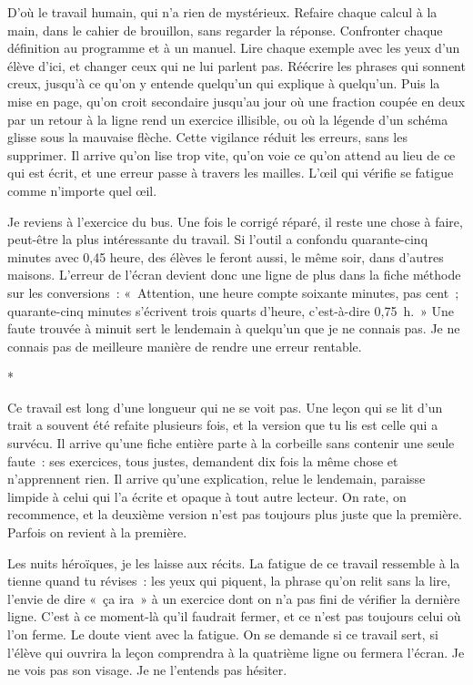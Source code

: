 \documentclass[10.5pt,twoside,openright]{book}
\newcommand{\asterisme}{\par\vspace{0.7em}\centerline{\color{gris}*\quad*\quad*}\vspace{0.7em}\par\noindent}
\begin{document}
D’où le travail humain, qui n’a rien de mystérieux. Refaire chaque calcul à la main, dans le cahier de brouillon, sans regarder la réponse. Confronter chaque définition au programme et à un manuel. Lire chaque exemple avec les yeux d’un élève d’ici, et changer ceux qui ne lui parlent pas. Réécrire les phrases qui sonnent creux, jusqu’à ce qu’on y entende quelqu’un qui explique à quelqu’un. Puis la mise en page, qu’on croit secondaire jusqu’au jour où une fraction coupée en deux par un retour à la ligne rend un exercice illisible, ou où la légende d’un schéma glisse sous la mauvaise flèche. Cette vigilance réduit les erreurs, sans les supprimer. Il arrive qu’on lise trop vite, qu’on voie ce qu’on attend au lieu de ce qui est écrit, et une erreur passe à travers les mailles. L’œil qui vérifie se fatigue comme n’importe quel œil.

Je reviens à l’exercice du bus. Une fois le corrigé réparé, il reste une chose à faire, peut-être la plus intéressante du travail. Si l’outil a confondu quarante-cinq minutes avec 0,45 heure, des élèves le feront aussi, le même soir, dans d’autres maisons. L’erreur de l’écran devient donc une ligne de plus dans la fiche méthode sur les conversions : « Attention, une heure compte soixante minutes, pas cent ; quarante-cinq minutes s’écrivent trois quarts d’heure, c’est-à-dire 0,75 h. » Une faute trouvée à minuit sert le lendemain à quelqu’un que je ne connais pas. Je ne connais pas de meilleure manière de rendre une erreur rentable.

\asterisme

Ce travail est long d’une longueur qui ne se voit pas. Une leçon qui se lit d’un trait a souvent été refaite plusieurs fois, et la version que tu lis est celle qui a survécu. Il arrive qu’une fiche entière parte à la corbeille sans contenir une seule faute : ses exercices, tous justes, demandent dix fois la même chose et n’apprennent rien. Il arrive qu’une explication, relue le lendemain, paraisse limpide à celui qui l’a écrite et opaque à tout autre lecteur. On rate, on recommence, et la deuxième version n’est pas toujours plus juste que la première. Parfois on revient à la première.

Les nuits héroïques, je les laisse aux récits. La fatigue de ce travail ressemble à la tienne quand tu révises : les yeux qui piquent, la phrase qu’on relit sans la lire, l’envie de dire « ça ira » à un exercice dont on n’a pas fini de vérifier la dernière ligne. C’est à ce moment-là qu’il faudrait fermer, et ce n’est pas toujours celui où l’on ferme. Le doute vient avec la fatigue. On se demande si ce travail sert, si l’élève qui ouvrira la leçon comprendra à la quatrième ligne ou fermera l’écran. Je ne vois pas son visage. Je ne l’entends pas hésiter.
\end{document}
